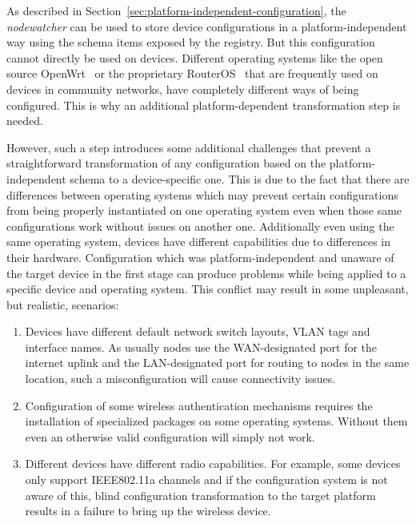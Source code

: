 \documentclass[5p,sort&compress]{elsarticle}
\newcommand{\nodewatcher}{\textit{nodewatcher}}
\begin{document}
As described in Section~\ref{sec:platform-independent-configuration}, the \nodewatcher{} can be used to store device configurations in a platform-independent way using the schema items exposed by the registry.
But this configuration cannot directly be used on devices.
Different operating systems like the open source OpenWrt~\cite{OpenWrt_2004} or the proprietary RouterOS~\cite{RouterOS_1995} that are frequently used on devices in community networks, have completely different ways of being configured.
This is why an additional platform-dependent transformation step is needed.

However, such a step introduces some additional challenges that prevent a straightforward transformation of any configuration based on the platform-independent schema to a device-specific one.
This is due to the fact that there are differences between operating systems which may prevent certain configurations from being properly instantiated on one operating system even when those same configurations work without issues on another one.
Additionally even using the same operating system, devices have different capabilities due to differences in their hardware.
Configuration which was platform-independent and unaware of the target device in the first stage can produce problems while being applied to a specific device and operating system.
This conflict may result in some unpleasant, but realistic, scenarios:
\begin{enumerate}[label=\roman*)]
\item Devices have different default network switch layouts, VLAN tags and interface names.
As usually nodes use the WAN-designated port for the internet uplink and the LAN-designated port for routing to nodes in the same location, such a misconfiguration will cause connectivity issues.

\item Configuration of some wireless authentication mechanisms requires the installation of specialized packages on some operating systems.
Without them even an otherwise valid configuration will simply not work.

\item Different devices have different radio capabilities.
For example, some devices only support IEEE802.11a channels and if the configuration system is not aware of this, blind configuration transformation to the target platform results in a failure to bring up the wireless device.
\end{enumerate}
\end{document}
